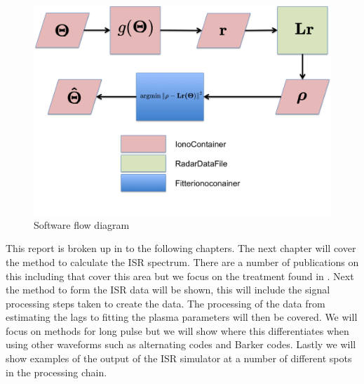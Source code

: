 \begin{figure}[!h]
\centering
\includegraphics[width=6.0in]{softwareflowandmath}
\caption{Software flow diagram}
\label{fig:swflow}
\end{figure}

This report is broken up in to the following chapters. The next chapter will cover the method to calculate the ISR spectrum. There are a number of publications on this including \cite{dougherty:farley1960, hagfors1971, sheffield2010} that cover this area but we focus on the treatment found in \cite{kudeki:milla:1}. Next the method to form the ISR data will be shown, this will include the signal processing steps taken to create the data. The processing of the data from estimating the lags to fitting the plasma parameters will then be covered. We will focus on methods for long pulse but we will show where this differentiates when using other waveforms such as alternating codes and Barker codes. Lastly we will show examples of the output of the ISR simulator at a number of different spots in the processing chain.